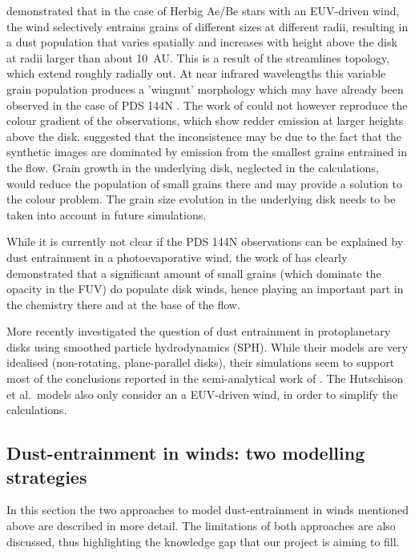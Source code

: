 \documentclass[10pt,fleqn,twoside]{article}
\begin{document}
\citet{2011MNRAS.411.1104O} demonstrated that in the case of
Herbig Ae/Be stars with an EUV-driven wind, the wind selectively entrains
grains of different sizes at different radii, resulting in a dust
population that varies spatially and increases with height above the
disk at radii larger than about 10~AU. This is a  result of the
streamlines topology, which extend roughly radially out. At near
infrared wavelengths 
this variable grain population produces a 'wingnut' morphology which
may have already been observed in the case of PDS 144N 
\citep{2006ApJ...645.1272P}. The work of \citet{2011MNRAS.411.1104O} could not however reproduce the
colour gradient of the observations, which show redder emission at
larger heights above the disk. \citet{2011MNRAS.411.1104O} suggested that the
inconsistence may be due to the
fact that the synthetic images are dominated by emission from the
smallest grains entrained in the flow. Grain growth in the underlying
disk, neglected in the
\citet{2011MNRAS.411.1104O} calculations, would reduce the population of
small grains there and may provide a solution to
the colour problem. The grain size evolution in the underlying disk
needs to be taken into account in future simulations. 

While it is currently not clear if the PDS 144N observations can be
explained by dust entrainment in a photoevaporative wind, the work of
\citet{2011MNRAS.411.1104O} has clearly demonstrated that a
significant amount of small grains (which dominate the opacity in the
FUV) do populate disk winds, hence playing an important part in the
chemistry there and at the base of the flow. 

More recently \citet{2016MNRAS.463.2725H, 2016MNRAS.461..742H}
investigated the question of
dust entrainment in protoplanetary disks using smoothed particle
hydrodynamics (SPH). While their models are very idealised (non-rotating,
plane-parallel disks), their simulations seem to support most of the
conclusions reported in the semi-analytical work of \citet{2011MNRAS.411.1104O}. 
The Hutschison et al.\ models also only consider an a
EUV-driven wind, in order to simplify the calculations.  

\subsection{Dust-entrainment in winds: two modelling strategies}

In this section the two approaches to model dust-entrainment in
winds mentioned above are described in more detail. The limitations of
both approaches are also discussed, thus highlighting the knowledge
gap that our project is aiming to fill. 
\end{document}
